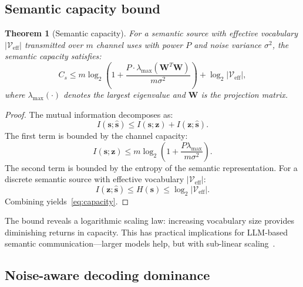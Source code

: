 \documentclass[a4paper,fleqn]{cas-sc}
\newtheorem{theorem}{Theorem}
\begin{document}
\subsection{Semantic capacity bound}

\begin{theorem}[Semantic capacity]\label{thm:capacity}
For a semantic source with effective vocabulary $|\mathcal{V}_{\text{eff}}|$ transmitted over $m$ channel uses with power $P$ and noise variance $\sigma^2$, the semantic capacity satisfies:
\begin{equation}\label{eq:capacity}
C_s \leq m \log_2\left(1 + \frac{P \cdot \lambda_{\max}(\mathbf{W}^T \mathbf{W})}{m \sigma^2}\right) + \log_2 |\mathcal{V}_{\text{eff}}|,
\end{equation}
where $\lambda_{\max}(\cdot)$ denotes the largest eigenvalue and $\mathbf{W}$ is the projection matrix.
\end{theorem}

\begin{proof}
The mutual information decomposes as:
\begin{equation}
I(\mathbf{s}; \hat{\mathbf{s}}) \leq I(\mathbf{s}; \mathbf{z}) + I(\mathbf{z}; \hat{\mathbf{s}}).
\end{equation}
The first term is bounded by the channel capacity:
\begin{equation}
I(\mathbf{s}; \mathbf{z}) \leq m \log_2\left(1 + \frac{P \lambda_{\max}}{m \sigma^2}\right).
\end{equation}
The second term is bounded by the entropy of the semantic representation. For a discrete semantic source with effective vocabulary $|\mathcal{V}_{\text{eff}}|$:
\begin{equation}
I(\mathbf{z}; \hat{\mathbf{s}}) \leq H(\mathbf{s}) \leq \log_2 |\mathcal{V}_{\text{eff}}|.
\end{equation}
Combining yields~\eqref{eq:capacity}.
\end{proof}

\begin{remark}
The bound reveals a logarithmic scaling law: increasing vocabulary size provides diminishing returns in capacity. This has practical implications for LLM-based semantic communication---larger models help, but with sub-linear scaling~\citep{kaplan2020scaling}.
\end{remark}

\subsection{Noise-aware decoding dominance}
\end{document}
